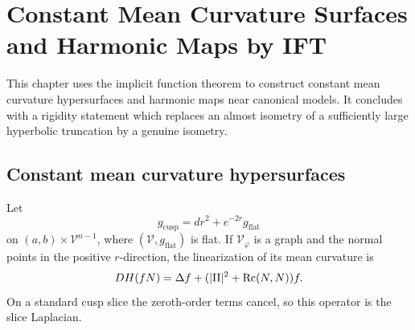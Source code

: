 \chapter{Constant Mean Curvature Surfaces and Harmonic Maps by IFT}
\label{ch:chow-iv-cmc-surfaces-harmonic-maps-ift}

This chapter uses the implicit function theorem to construct constant mean
curvature hypersurfaces and harmonic maps near canonical models.  It concludes
with a rigidity statement which replaces an almost isometry of a sufficiently
large hyperbolic truncation by a genuine isometry.

\section{Constant mean curvature hypersurfaces}

Let
\[
 g_{\mathrm{cusp}}=dr^2+e^{-2r}g_{\mathrm{flat}}
\]
on \((a,b)\times\mathcal V^{n-1}\), where \((\mathcal V,g_{\mathrm{flat}})\)
is flat.  If \(\mathcal V_\varphi\) is a graph and the normal points in the
positive \(r\)-direction, the linearization of its mean curvature is
\[
 DH(fN)=\Delta f+(|\mathrm{II}|^2+\operatorname{Rc}(N,N))f.
\]
On a standard cusp slice the zeroth-order terms cancel, so this operator is
the slice Laplacian.

